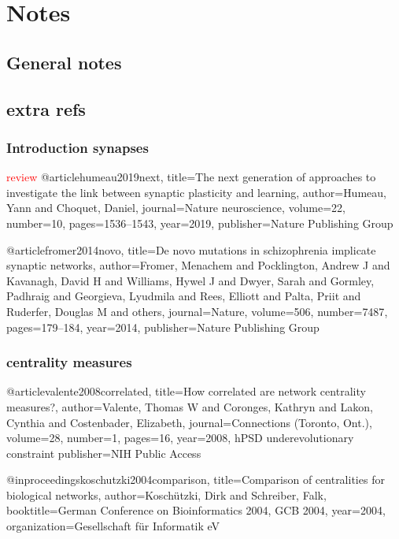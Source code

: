 \chapter{Notes}
\section{General notes}
\section{extra refs}


\subsection{Introduction synapses}
\textcolor{red}{review}
@article{humeau2019next,
  title={The next generation of approaches to investigate the link between synaptic plasticity and learning},
  author={Humeau, Yann and Choquet, Daniel},
  journal={Nature neuroscience},
  volume={22},
  number={10},
  pages={1536--1543},
  year={2019},
  publisher={Nature Publishing Group}
}



@article{fromer2014novo,
  title={De novo mutations in schizophrenia implicate synaptic networks},
  author={Fromer, Menachem and Pocklington, Andrew J and Kavanagh, David H and Williams, Hywel J and Dwyer, Sarah and Gormley, Padhraig and Georgieva, Lyudmila and Rees, Elliott and Palta, Priit and Ruderfer, Douglas M and others},
  journal={Nature},
  volume={506},
  number={7487},
  pages={179--184},
  year={2014},
  publisher={Nature Publishing Group}
}

\subsection{centrality measures}
@article{valente2008correlated,
  title={How correlated are network centrality measures?},
  author={Valente, Thomas W and Coronges, Kathryn and Lakon, Cynthia and Costenbader, Elizabeth},
  journal={Connections (Toronto, Ont.)},
  volume={28},
  number={1},
  pages={16},
  year={2008},\cite{bayes2011characterization} hPSD underevolutionary constraint
  publisher={NIH Public Access}
}

@inproceedings{koschutzki2004comparison,
  title={Comparison of centralities for biological networks},
  author={Kosch{\"u}tzki, Dirk and Schreiber, Falk},
  booktitle={German Conference on Bioinformatics 2004, GCB 2004},
  year={2004},
  organization={Gesellschaft f{\"u}r Informatik eV}
}

